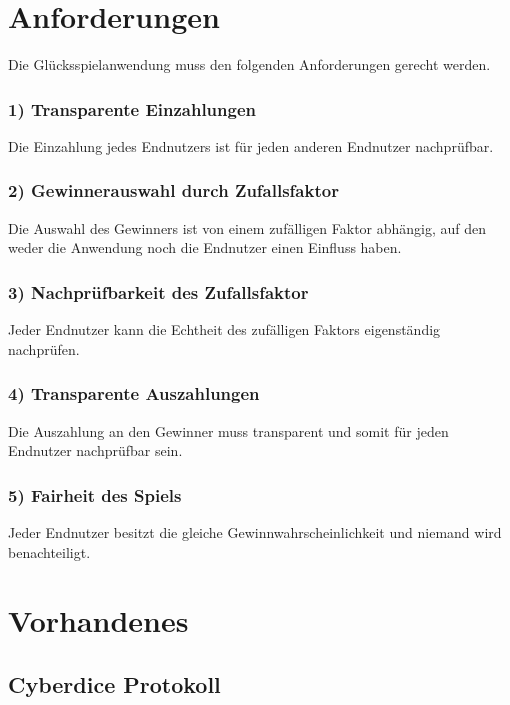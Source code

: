 

\section{Anforderungen}\label{anforderungen}
Die Glücksspielanwendung muss den folgenden Anforderungen gerecht werden.
\subsubsection{1) Transparente Einzahlungen}
Die Einzahlung jedes Endnutzers ist für jeden anderen Endnutzer nachprüfbar.
\subsubsection{2) Gewinnerauswahl durch Zufallsfaktor}
Die Auswahl des Gewinners ist von einem zufälligen Faktor abhängig, auf den weder die Anwendung noch die Endnutzer einen Einfluss haben.
\subsubsection{3) Nachprüfbarkeit des Zufallsfaktor}
Jeder Endnutzer kann die Echtheit des zufälligen Faktors eigenständig nachprüfen.
\subsubsection{4) Transparente Auszahlungen}
Die Auszahlung an den Gewinner muss transparent und somit für jeden Endnutzer nachprüfbar sein.
\subsubsection{5) Fairheit des Spiels}
Jeder Endnutzer besitzt die gleiche Gewinnwahrscheinlichkeit und niemand wird benachteiligt.

\section{Vorhandenes}

\subsection{Cyberdice Protokoll}

